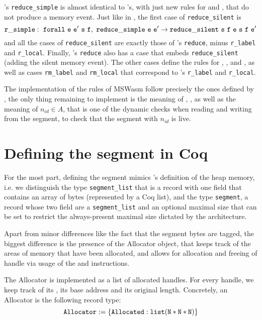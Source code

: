 \documentclass[a4paper]{article}
\begin{document}
\irismswasm's {\tt reduce\_simple} is almost identical to \iriswasm's, with just new rules for \xxWhandleadd and \xxWslice, that do not produce a memory event. Just like in \iriswasm, the first case of {\tt reduce\_silent} is \[ \tt r\_simple:~forall~e~e'~s~f,~reduce\_simple~e~e'\to reduce\_silent~s~f~e~s~f~e' \] and all the cases of {\tt reduce\_silent} are exactly those of \iriswasm's {\tt reduce}, minus {\tt r\_label} and {\tt r\_local}. Finally, \irismswasm's {\tt reduce} also has a case that embeds {\tt reduce\_silent} (adding the silent \xxCMEempty memory event). The other cases define the rules for \xxWsegload, \xxWsegstore, \xxWsegalloc and \xxWsegfree, as well as cases {\tt rm\_label} and {\tt rm\_local} that correspond to \iriswasm's {\tt r\_label} and {\tt r\_local}.

The implementation of the rules of MSWasm follow precisely the ones defined by \citet{mswasm}, the only thing remaining to implement is the meaning of , , as well as the meaning of \( n_{id}\in A \), that is one of the dynamic checks when reading and writing from the segment, to check that the segment with \xxWid \( n_{id} \) is live.

\section{Defining the segment in Coq}

For the most part, defining the segment mimics \iriswasm's definition of the heap memory, i.e. we distinguish the type {\tt segment\_list} that is a record with one field that contains an array of bytes (represented by a Coq list), and the type {\tt segment}, a record whose two field are a {\tt segment\_list} and an optional maximal size that can be set to restrict the always-present maximal size dictated by the architecture.

Apart from minor differences like the fact that the segment bytes are tagged, the biggest difference is the presence of the Allocator object, that keeps track of the areas of memory that have been allocated, and allows for allocation and freeing of handle via usage of the \xxWsegalloc and \xxWsegfree instructions.

The Allocator is implemented as a list of allocated handles. For every handle, we keep track of its \xxWid, its base address and its original length. Concretely, an Allocator is the following record type:
\[ \tt Allocator := \{ Allocated : list (N * N * N) \} \]
\end{document}
